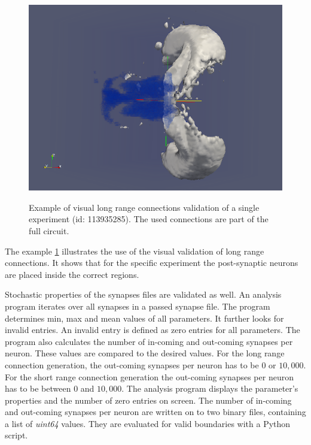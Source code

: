 \begin{figure}[ht!]
\begin{center}
{            \includegraphics[scale=0.15]{pictures/exp1_post_contour.png}
       }
    \end{center}
    	\caption{%
        Example of visual long range connections validation of a single experiment (id: 113935285).
        The used connections are part of the full circuit.
     }%
   \label{fig:longrangevalidation}
   \end{figure}
   
The example \ref{fig:longrangevalidation} illustrates the use of the visual validation of long range connections.
It shows that for the specific experiment the post-synaptic neurons are placed inside the correct regions.

Stochastic properties of the synapses files are validated as well.
An analysis program iterates over all synapses in a passed synapse file.
The program determines min, max and mean values of all parameters.
It further looks for invalid entries. An invalid entry is defined as
zero entries for all parameters. The program also calculates the number of in-coming
and out-coming synapses per neuron. These values are compared to the desired values.
For the long range connection generation, the out-coming synapses per neuron has to be
$0$ or $10,000$. For the short range connection generation the out-coming synapses per neuron
has to be between $0$ and $10,000$. The analysis program displays the parameter’s properties
and the number of zero entries on screen. The number of in-coming and out-coming 
synapses per neuron are written on to two binary files, containing a list of \emph{uint64} values.
They are evaluated for valid boundaries with a Python script.



